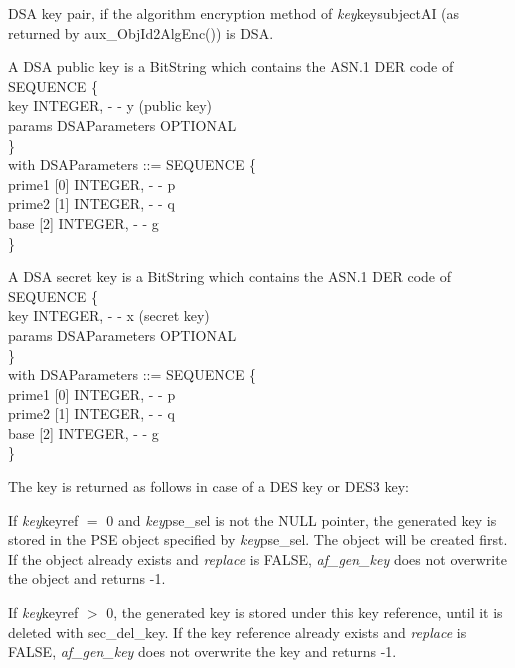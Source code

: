 \m  DSA key pair, 
    if the algorithm encryption method 
    of {\em key}\pf key\pf subjectAI (as returned by aux\_ObjId2AlgEnc()) is DSA. 

    A DSA public key is a BitString
    which contains the ASN.1 DER code of
    \bvtab
    \4  SEQUENCE \{ \\
    \4  \2       key INTEGER, - - y (public key)   \\
    \4  \2       params DSAParameters OPTIONAL  \\
    \4  \} \\
    \evtab
    with
    \bvtab
    DSAParameters ::= SEQUENCE \{ \\
    \4  \2       prime1 [0] INTEGER, - - p \\
    \4  \2       prime2 [1] INTEGER, - - q \\
    \4  \2       base [2] INTEGER, - - g \\
    \4  \} \\
    \evtab
    
    A DSA secret key is a BitString
    which contains the ASN.1 DER code of
    \bvtab
    \4  SEQUENCE \{ \\
    \4  \2       key INTEGER, - - x (secret key)   \\
    \4  \2       params DSAParameters OPTIONAL  \\
    \4  \} \\
    \evtab
    with
    \bvtab
    DSAParameters ::= SEQUENCE \{ \\
    \4  \2       prime1 [0] INTEGER, - - p \\
    \4  \2       prime2 [1] INTEGER, - - q \\
    \4  \2       base [2] INTEGER, - - g \\
    \4  \} \\
    \evtab

\ei

The key is returned as follows in case of a DES key or DES3 key:

If {\em key}\pf keyref $=$ 0 and {\em key}\pf pse\_sel is not the NULL pointer, the generated key
is stored in the PSE object specified by {\em key}\pf pse\_sel. The object will be
created first. 
If the object already exists and {\em replace} is FALSE, {\em af\_gen\_key}
does not overwrite the object and returns -1.
 
If {\em key}\pf keyref $>$ 0, the generated key is stored under this key reference, until it is
deleted with sec\_del\_key. 
If the key reference already exists and {\em replace} is FALSE, {\em af\_gen\_key}
does not overwrite the key and returns -1.
 

